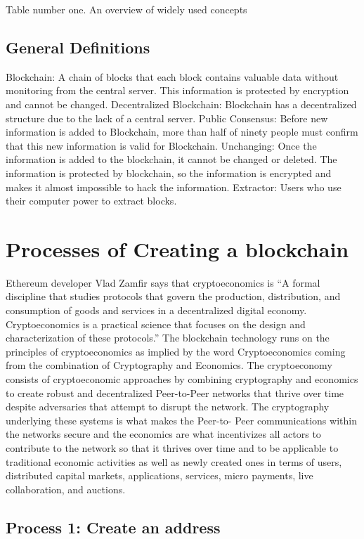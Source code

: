 Table number one. An overview of widely used concepts 
\textcite{tasatanattakool2018blockchain}
\linebreak

\raggedright\subsection{General Definitions}
Blockchain:
A chain of blocks that each block contains valuable data without monitoring from the central server. This information is protected by encryption and cannot be changed.
Decentralized Blockchain:
Blockchain has a decentralized structure due to the lack of a central server.
Public Consensus:
Before new information is added to Blockchain, more than half of ninety people must confirm that this new information is valid for Blockchain.
Unchanging:
Once the information is added to the blockchain, it cannot be changed or deleted. The information is protected by blockchain, so the information is encrypted and makes it almost impossible to hack the information.
Extractor:
Users who use their computer power to extract blocks.

\section{Processes of Creating a blockchain }
Ethereum developer Vlad Zamfir says that cryptoeconomics is “A formal discipline that studies protocols that govern the production, distribution, and consumption of goods and services in a decentralized digital economy. Cryptoeconomics is a practical science that focuses on the design and characterization of these protocols.” The blockchain technology runs on the principles of cryptoeconomics as implied by the word Cryptoeconomics coming from the combination of Cryptography and Economics. The cryptoeconomy consists of cryptoeconomic approaches by combining cryptography and economics to create robust and decentralized Peer-to-Peer networks that thrive over time despite adversaries that attempt to disrupt the network. The cryptography underlying these systems is what makes the Peer-to- Peer communications within the networks secure and the economics are what incentivizes all actors to contribute to the network so that it thrives over time and to be applicable to traditional economic activities as well as newly created ones in terms of users, distributed capital markets, applications, services, micro payments, live collaboration, and auctions.\textcite{choecreating}
\subsection{Process 1: Create an address}


